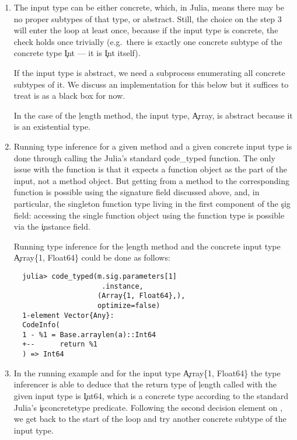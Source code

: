 \documentclass[sigplan,review,anonymous]{acmart}
\begin{document}
\begin{enumerate}
  \item The input type can be either concrete, which, in Julia, means there may
  be no proper subtypes of that type, or abstract. Still, the choice on the
  step 3 will enter the loop at least once, because if the input type is
  concrete, the check holds once trivially (e.g.\ there is exactly one concrete
  subtype of the concrete type \c{Int} --- it is \c{Int} itself).

  If the input type is abstract, we need a subprocess enumerating all concrete
  subtypes of it. We discuss an implementation for this below but it suffices to
  treat is as a black box for now. %

  In the case of the \c{length} method, the input type, \c{Array}, is abstract
  because it is an existential type.

  \item Running type inference for a given method and a given concrete input
  type is done through calling the Julia's standard \c{code\_typed} function.
  The only issue with the function is that it expects a function object as the
  part of the input, not a method object. But getting from a method to the
  corresponding function is possible using the signature field discussed above,
  and, in particular, the singleton function type living in the first component
  of the \c{sig} field: accessing the single function object using the function
  type is possible via the \c{instance} field.

  Running type inference for the \c{length} method and the concrete input type
  \c{Array\{1, Float64\}} could be done as follows:
\begin{verbatim}
  julia> code_typed(m.sig.parameters[1]
                     .instance,
                    (Array{1, Float64},),
                    optimize=false)
  1-element Vector{Any}:
  CodeInfo(
  1 - %1 = Base.arraylen(a)::Int64
  +--      return %1
  ) => Int64
\end{verbatim}

  \item In the running example and for the input type \c{Array\{1, Float64\}}
  the type inferencer is able to deduce that the return type of \c{length}
  called with the given input type is \c{Int64}, which is a concrete type
  according to the standard Julia's \c{isconcretetype} predicate.
  Following the second decision element on , we get back to
  the start of the loop and try another concrete subtype of the input type.
\end{enumerate}
\end{document}
